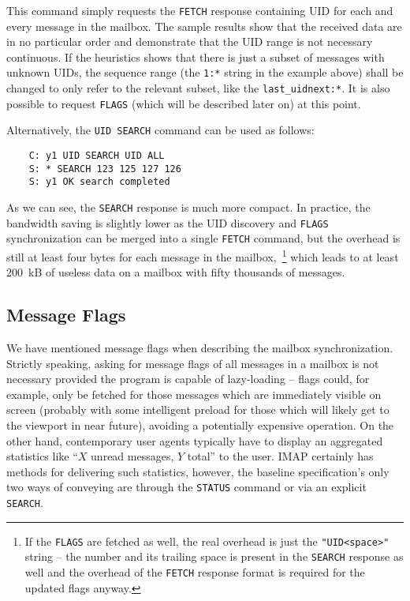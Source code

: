 \documentclass[trojita]{subfiles}
\begin{document}
This command simply requests the {\tt FETCH} response containing UID for each and every message in the mailbox.  The
sample results show that the received data are in no particular order and demonstrate that the UID range is not
necessary continuous.  If the heuristics shows that there is just a subset of messages with unknown UIDs,
the sequence range (the {\tt 1:*} string in the example above) shall be changed to only refer to the relevant subset,
like the {\tt last\_uidnext:*}.  It is also possible to request {\tt FLAGS} (which will be described later on) at this
point.

Alternatively, the {\tt UID SEARCH} command can be used as follows:

\begin{verbatim}
    C: y1 UID SEARCH UID ALL
    S: * SEARCH 123 125 127 126
    S: y1 OK search completed
\end{verbatim}

As we can see, the {\tt SEARCH} response is much more compact.  In practice, the bandwidth saving is slightly lower as
the UID discovery and {\tt FLAGS} synchronization can be merged into a single {\tt FETCH} command, but the overhead is
still at least four bytes for each message in the mailbox,~\footnote{If the {\tt FLAGS} are fetched as well, the real
overhead is just the {\tt "UID<space>"} string -- the number and its trailing space is present in the {\tt SEARCH}
response as well and the overhead of the {\tt FETCH} response format is required for the updated flags anyway.} which
leads to at least 200~kB of useless data on a mailbox with fifty thousands of messages.

\subsection{Message Flags}

We have mentioned message flags when describing the mailbox synchronization.  Strictly speaking, asking for message
flags of all messages in a mailbox is not necessary provided the program is capable of lazy-loading -- flags could, for
example, only be fetched for those messages which are immediately visible on screen (probably with some intelligent
preload for those which will likely get to the viewport in near future), avoiding a potentially expensive operation.  On
the other hand, contemporary user agents typically have to display an aggregated statistics like ``$X$ unread messages,
$Y$ total'' to the user.  IMAP certainly has methods for delivering such statistics, however, the baseline
specification's only two ways of conveying are through the {\tt STATUS} command or via an explicit {\tt SEARCH}.
\end{document}
